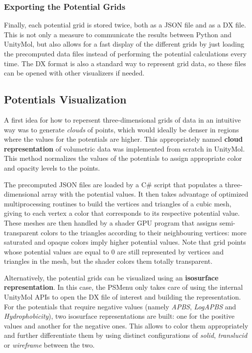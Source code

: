     \subsubsection{Exporting the Potential Grids}
      Finally, each potential grid is stored twice, both as a JSON file and as a DX file. This is not only a measure to communicate the results between Python and UnityMol, but also allows for a fast display of the different grids by just loading the precomputed data files instead of performing the potential calculations every time. The DX format is also a standard way to represent grid data, so these files can be opened with other visualizers if needed.

  \subsection{Potentials Visualization}
    A first idea for how to repersent three-dimensional grids of data in an intuitive way was to generate \textit{clouds} of points, which would ideally be denser in regions where the values for the potentials are higher. This appropriately named \textbf{cloud representation} of volumetric data was implemented from scratch in UnityMol. This method normalizes the values of the potentials to assign appropriate color and opacity levels to the points.

    The precomputed JSON files are loaded by a C\# script that populates a three-dimensional array with the potential values. It then takes advantage of optimized multiprocessing routines to build the vertices and triangles of a cubic mesh, giving to each vertex a color that corresponds to its respective potential value. These meshes are then handled by a shader GPU program that assigns semi-transparent colors to the triangles according to their neighbouring vertices: more saturated and opaque colors imply higher potential values. Note that grid points whose potential values are equal to 0 are still represented by vertices and triangles in the mesh, but the shader colors them totally transparent.

    Alternatively, the potential grids can be visualized using an \textbf{isosurface representation}. In this case, the PSMenu only takes care of using the internal UnityMol APIs to open the DX file of interest and building the representation. For the potentials that require negative values (namely \textit{APBS}, \textit{LogAPBS} and \textit{Hydrophobicity}), two isosurface representations are built: one for the positive values and another for the negative ones. This allows to color them appropriately and further differentiate them by using distinct configurations of \textit{solid}, \textit{translucid} or \textit{wireframe} between the two.


